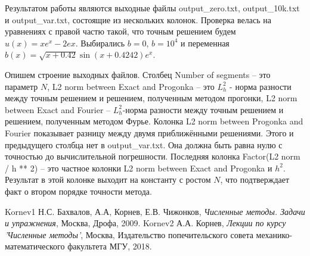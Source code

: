 \documentclass[12 pt, russian]{article}
\begin{document}
Результатом работы являются выходные файлы output\_zero.txt, output\_10k.txt и output\_var.txt, состоящие из нескольких колонок.
Проверка велась на уравнениях с правой частю такой, что точным решением будем $u(x) = xe^x - 2ex$. Выбирались $b = 0$, $b = 10^4$ и переменная $b(x) = \sqrt{x + 0.42} \sin(x + 0.4242) e^x$.

Опишем строение выходных файлов. Столбец Number of segments -- это параметр $N$, L2 norm between Exact and Progonka -- это $L^2_h$ - норма разности между точным решением и решением, полученным методом прогонки, L2 norm between Exact and Fourier -- $L^2_h$-норма разности между точным решением и решением, полученным методом Фурье. Колонка L2 norm between Progonka and Fourier показывает разницу между двумя приближёнными решениями. Этого и предыдущего столбца нет в output\_var.txt. Она должна быть равна нулю с точностью до вычислительной погрешности. Последняя колонка Factor(L2 norm / h ** 2) -- это частное колонки  L2 norm between Exact and Progonka и $h^2$. Результат в этой колонке выходит на константу с ростом $N$, что подтверждает факт о втором порядке точности метода. 
 


\begin{thebibliography}{100}
	\bibitem
	{Kornev1}
	Н.С. Бахвалов, А.А, Корнев, Е.В. Чижонков, {\it Численные методы. Задачи и упражнения}, Москва, Дрофа, 2009.
	\bibitem
	{Kornev2}
	А.А. Корнев, {\it Лекции по курсу 'Численные методы'}, Москва, Издательство попечительского совета механико-математического факультета МГУ, 2018.

\end{thebibliography}
\end{document}
